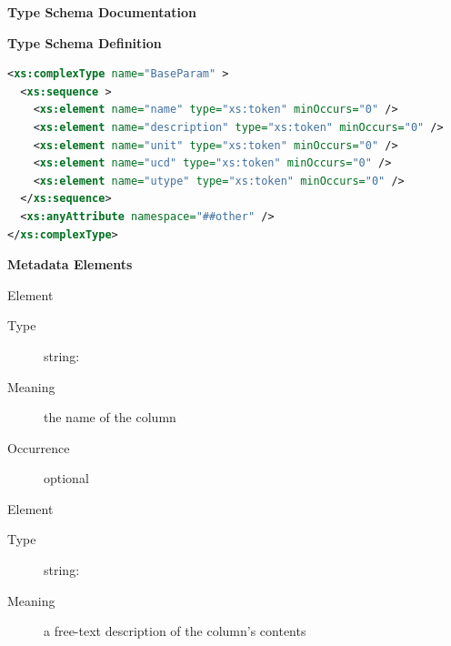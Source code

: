 \documentclass[11pt,a4paper]{ivoa}
\begin{document}
\begin{generated}
\begingroup
      	\renewcommand*\descriptionlabel[1]{%
      	\hbox to 5.5em{\emph{#1}\hfil}}\vspace{2ex}\noindent\textbf{ Type Schema Documentation}



\vspace{1ex}\noindent\textbf{ Type Schema Definition}

\begin{lstlisting}[language=XML,basicstyle=\footnotesize]
<xs:complexType name="BaseParam" >
  <xs:sequence >
    <xs:element name="name" type="xs:token" minOccurs="0" />
    <xs:element name="description" type="xs:token" minOccurs="0" />
    <xs:element name="unit" type="xs:token" minOccurs="0" />
    <xs:element name="ucd" type="xs:token" minOccurs="0" />
    <xs:element name="utype" type="xs:token" minOccurs="0" />
  </xs:sequence>
  <xs:anyAttribute namespace="##other" />
</xs:complexType>
\end{lstlisting}

\vspace{0.5ex}\noindent\textbf{ Metadata Elements}

\begingroup\small\begin{bigdescription}\item[Element \xmlel{name}]
\begin{description}
\item[Type] string: 
\item[Meaning] 
                  the name of the column
               
\item[Occurrence] optional

\end{description}
\item[Element \xmlel{description}]
\begin{description}
\item[Type] string: 
\item[Meaning] 
                  a free-text description of the column's contents
               

\end{description}
\end{bigdescription}
\end{generated}
\end{document}
